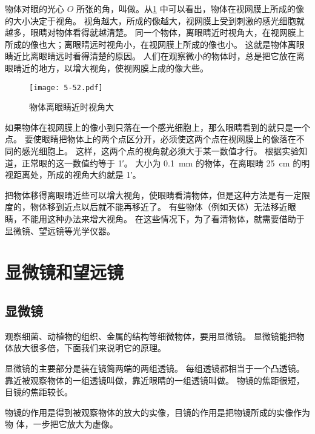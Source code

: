 物体对眼的光心 $O$ 所张的角，叫做。从\cref{fig:5-52} 中可以看出，物体在视网膜上所成的像的大小决定于视角。
视角越大，所成的像越大，视网膜上受到刺激的感光细胞就越多，眼睛对物体看得就越清楚。
同一个物体，离眼睛近时视角大，在视网膜上所成的像也大；离眼睛远时视角小，在视网膜上所成的像也小。
这就是物体离眼睛近比离眼睛远时看得清楚的原因。
人们在观察微小的物体时，总是把它放在离眼睛近的地方，以增大视角，使视网膜上成的像大些。

\begin{figure}
  \texttt{[image: 5-52.pdf]}
  \caption{物体离眼睛近时视角大}\label{fig:5-52}
\end{figure}

如果物体在视网膜上的像小到只落在一个感光细胞上，那么眼睛看到的就只是一个点。
要使眼睛把物体上的两个点区分开，必须使这两个点在视网膜上的像落在不同的感光细胞上。
这样，这两个点的视角就必须大于某一数值才行。
根据实验知道，正常眼的这一数值约等于 \ang{;1;}。
大小为 \qty{0.1}{mm} 的物体，在离眼睛 \qty{25}{cm} 的明视距离处，所成的视角大约就是 \ang{;1;}。

把物体移得离眼睛近些可以增大视角，使眼睛看清物体，但是这种方法是有一定限度的，物体移到近点以后就不能再移近了。
有些物体（例如天体）无法移近眼睛，不能用这种办法来增大视角。
在这些情况下，为了看清物体，就需要借助于显微镜、望远镜等光学仪器。

\section{显微镜和望远镜}
\subsection{显微镜}
观察细菌、动植物的组织、金属的结构等细微物体，要用显微镜。
显微镜能把物体放大很多倍，下面我们来说明它的原理。

显微镜的主要部分是装在镜筒两端的两组透镜。
每组透镜都相当于一个凸透镜。
靠近被观察物体的一组透镜叫做，靠近眼睛的一组透镜叫做。
物镜的焦距很短，目镜的焦距较长。

物镜的作用是得到被观察物体的放大的实像，目镜的作用是把物镜所成的实像作为物
体，一步把它放大为虚像。

